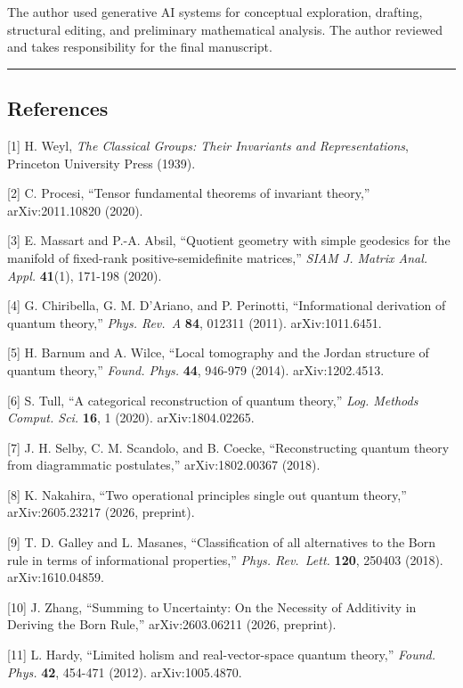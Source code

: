\documentclass[
]{article}
\begin{document}
The author used generative AI systems for conceptual exploration,
drafting, structural editing, and preliminary mathematical analysis. The
author reviewed and takes responsibility for the final manuscript.

\begin{center}\rule{0.5\linewidth}{0.5pt}\end{center}

\subsection{References}\label{references}

{[}1{]} H. Weyl, \emph{The Classical Groups: Their Invariants and
Representations}, Princeton University Press (1939).

{[}2{]} C. Procesi, ``Tensor fundamental theorems of invariant theory,''
arXiv:2011.10820 (2020).

{[}3{]} E. Massart and P.-A. Absil, ``Quotient geometry with simple
geodesics for the manifold of fixed-rank positive-semidefinite
matrices,'' \emph{SIAM J. Matrix Anal. Appl.} \textbf{41}(1), 171-198
(2020).

{[}4{]} G. Chiribella, G. M. D'Ariano, and P. Perinotti, ``Informational
derivation of quantum theory,'' \emph{Phys. Rev.~A} \textbf{84}, 012311
(2011). arXiv:1011.6451.

{[}5{]} H. Barnum and A. Wilce, ``Local tomography and the Jordan
structure of quantum theory,'' \emph{Found. Phys.} \textbf{44}, 946-979
(2014). arXiv:1202.4513.

{[}6{]} S. Tull, ``A categorical reconstruction of quantum theory,''
\emph{Log. Methods Comput. Sci.} \textbf{16}, 1 (2020).
arXiv:1804.02265.

{[}7{]} J. H. Selby, C. M. Scandolo, and B. Coecke, ``Reconstructing
quantum theory from diagrammatic postulates,'' arXiv:1802.00367 (2018).

{[}8{]} K. Nakahira, ``Two operational principles single out quantum
theory,'' arXiv:2605.23217 (2026, preprint).

{[}9{]} T. D. Galley and L. Masanes, ``Classification of all
alternatives to the Born rule in terms of informational properties,''
\emph{Phys. Rev.~Lett.} \textbf{120}, 250403 (2018). arXiv:1610.04859.

{[}10{]} J. Zhang, ``Summing to Uncertainty: On the Necessity of
Additivity in Deriving the Born Rule,'' arXiv:2603.06211 (2026,
preprint).

{[}11{]} L. Hardy, ``Limited holism and real-vector-space quantum
theory,'' \emph{Found. Phys.} \textbf{42}, 454-471 (2012).
arXiv:1005.4870.
\end{document}
